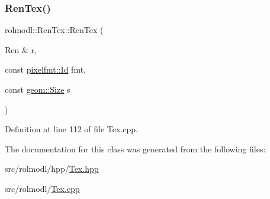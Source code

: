 \subsubsection{\texorpdfstring{RenTex()}{RenTex()}}
{\footnotesize\ttfamily rolmodl\+::\+Ren\+Tex\+::\+Ren\+Tex (\begin{DoxyParamCaption}\item[{Ren \&}]{r,  }\item[{const \mbox{\hyperlink{namespacerolmodl_1_1pixelfmt_a96282713e4465ba9211c8fd3a702b52b}{pixelfmt\+::\+Id}}}]{fmt,  }\item[{const \mbox{\hyperlink{structrolmodl_1_1geom_1_1_size}{geom\+::\+Size}}}]{s }\end{DoxyParamCaption})}



Definition at line 112 of file Tex.\+cpp.



The documentation for this class was generated from the following files\+:\begin{DoxyCompactItemize}
\item 
src/rolmodl/hpp/\mbox{\hyperlink{_tex_8hpp}{Tex.\+hpp}}\item 
src/rolmodl/\mbox{\hyperlink{_tex_8cpp}{Tex.\+cpp}}\end{DoxyCompactItemize}
